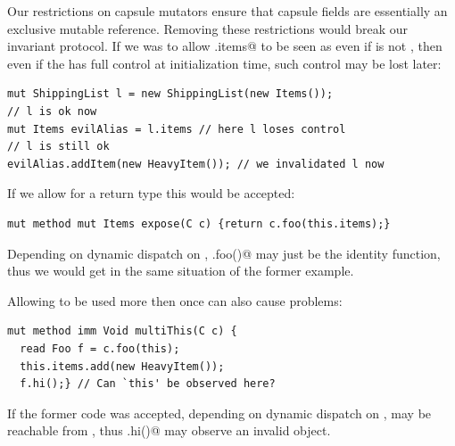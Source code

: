 Our restrictions on capsule mutators ensure that capsule fields are essentially an exclusive mutable reference.
Removing these restrictions would break our invariant protocol.
If we was to allow \Q@x.items@ to be seen as \Q@mut@ even if
\Q@x@ is not \Q@this@, then even if the \Q@ShippingList@ has full control at initialization time,
such control may be lost later:
\saveSpace
\begin{lstlisting}
mut ShippingList l = new ShippingList(new Items());
// l is ok now
mut Items evilAlias = l.items // here l loses control
// l is still ok
evilAlias.addItem(new HeavyItem()); // we invalidated l now
\end{lstlisting}
\saveSpace
If we allow for a \Q@mut@ return type this would be accepted:
\saveSpace
\begin{lstlisting}
mut method mut Items expose(C c) {return c.foo(this.items);}
\end{lstlisting}
\saveSpace
\noindent Depending on dynamic dispatch on \Q@c@, \Q@c.foo()@ may just be the identity function, thus
we would get in the same situation of the former example.




Allowing \Q@this@ to be used more then once can also cause problems:
\saveSpace
\begin{lstlisting}
mut method imm Void multiThis(C c) {
  read Foo f = c.foo(this);
  this.items.add(new HeavyItem());
  f.hi();} // Can `this' be observed here?
\end{lstlisting}
\saveSpace
\noindent If the former code was accepted, depending on dynamic dispatch on \Q@c@,
\Q@this@ may be reachable from \Q@f@, thus \Q@f.hi()@ may observe an invalid object.

